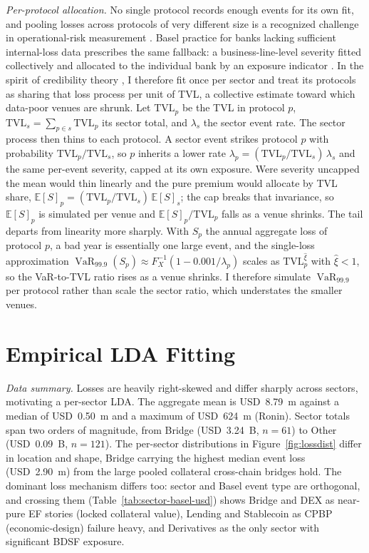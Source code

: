 \documentclass[runningheads]{llncs}
\newcommand{\E}{\mathbb{E}}
\newcommand{\VaR}{\operatorname{VaR}}
\begin{document}
\emph{Per-protocol allocation.} No single protocol records enough
events for its own fit, and pooling losses across protocols of very
different size is a recognized challenge in operational-risk
measurement \citep{Cope2009}. Basel practice for banks lacking sufficient
internal-loss data prescribes the same fallback: a business-line-level
severity fitted collectively and allocated to the individual bank by an
exposure indicator \citep{Chernobai2008}. In the spirit of credibility
theory \citep{BuhlmannGisler2005}, I therefore fit once per sector and
treat its protocols as sharing that loss process per unit of TVL, a
collective estimate toward which data-poor venues are shrunk. Let
$\text{TVL}_p$ be the TVL in protocol $p$,
$\text{TVL}_s=\sum_{p\in s}\text{TVL}_p$ its sector total, and
$\lambda_s$ the sector event rate. The sector process then thins
to each protocol. A sector event strikes protocol $p$ with probability
$\text{TVL}_p/\text{TVL}_s$, so $p$ inherits a lower rate
$\lambda_p=(\text{TVL}_p/\text{TVL}_s)\,\lambda_s$ and the same
per-event severity, capped at its own exposure. Were severity uncapped the
mean would thin linearly and the pure premium would allocate by TVL share,
$\E[S]_p=(\text{TVL}_p/\text{TVL}_s)\,\E[S]_s$; the cap breaks that
invariance, so $\E[S]_p$ is simulated per venue and $\E[S]_p/\text{TVL}_p$
falls as a venue shrinks. The tail departs from linearity more sharply. With
$S_p$ the annual aggregate loss of protocol $p$, a bad year is
essentially one large event, and the single-loss approximation
$\VaR_{99.9}(S_p)\approx F_X^{-1}(1-0.001/\lambda_p)$
\citep{BockerKluppelberg2005,EmbrechtsKM1997} scales as
$\text{TVL}_p^{\hat\xi}$ with $\hat\xi<1$, so the VaR-to-TVL ratio rises
as a venue shrinks. I therefore simulate $\VaR_{99.9}$ per protocol
rather than scale the sector ratio, which understates the smaller
venues.


\section{Empirical LDA Fitting}\label{sec:empirical}

\emph{Data summary.} Losses are heavily right-skewed and differ sharply
across sectors, motivating a per-sector LDA. The aggregate mean is
USD~8.79~m against a median of USD~0.50~m and a maximum of USD~624~m
(Ronin). Sector totals span two orders of magnitude, from Bridge
(USD~3.24~B, $n=61$) to Other (USD~0.09~B, $n=121$). The per-sector
distributions in Figure~\ref{fig:lossdist} differ in location and shape,
Bridge carrying the highest median event loss (USD~2.90~m) from the
large pooled collateral cross-chain bridges hold. The dominant loss
mechanism differs too: sector and Basel event type are orthogonal, and
crossing them (Table~\ref{tab:sector-basel-usd}) shows Bridge and DEX as
near-pure EF stories (locked collateral value), Lending and Stablecoin as
CPBP (economic-design) failure heavy, and Derivatives as the only sector with significant BDSF exposure.
\end{document}
